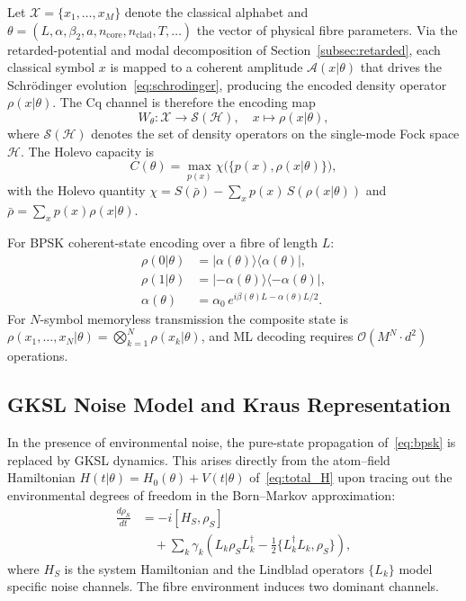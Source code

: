 \documentclass[journal,twocolumn]{IEEEtran}
\theoremstyle{definition}
\theoremstyle{plain}
\newcommand{\calH}{\mathcal{H}}
\begin{document}
Let $\mathcal{X} = \{x_1, \dots, x_M\}$ denote the classical
alphabet and $\theta = (L, \alpha, \beta_2, a, n_{\mathrm{core}},
n_{\mathrm{clad}}, T, \ldots)$ the vector of physical fibre
parameters.  Via the retarded-potential and modal decomposition of
Section~\ref{subsec:retarded}, each classical symbol $x$ is mapped
to a coherent amplitude $\mathcal{A}(x|\theta)$ that drives the
Schr\"{o}dinger evolution~\eqref{eq:schrodinger}, producing the
encoded density operator $\rho(x|\theta)$.  The Cq channel is
therefore the encoding map
\begin{equation}
  W_\theta : \mathcal{X} \to \mathcal{S}(\calH), \quad
  x \mapsto \rho(x|\theta),
  \label{eq:cq_channel}
\end{equation}
where $\mathcal{S}(\calH)$ denotes the set of density operators on
the single-mode Fock space $\calH$.  The Holevo capacity is
\begin{equation}
  C(\theta) = \max_{p(x)} \chi\bigl(\{p(x), \rho(x|\theta)\}\bigr),
  \label{eq:holevo_capacity}
\end{equation}
with the Holevo quantity
$\chi = S(\bar\rho) - \sum_x p(x)\, S(\rho(x|\theta))$ and
$\bar\rho = \sum_x p(x)\rho(x|\theta)$.

For BPSK coherent-state encoding over a fibre of length $L$:
\begin{align}
  \rho(0|\theta) &= |\alpha(\theta)\rangle\langle\alpha(\theta)|,
  \nonumber\\
  \rho(1|\theta) &= |-\alpha(\theta)\rangle\langle-\alpha(\theta)|,
  \label{eq:bpsk}\\
  \alpha(\theta) &= \alpha_0\,e^{i\beta(\theta)L - \alpha(\theta)L/2}.
  \nonumber
\end{align}
For $N$-symbol memoryless transmission the composite state is
$\rho(x_1,\dots,x_N|\theta) = \bigotimes_{k=1}^N \rho(x_k|\theta)$,
and ML decoding requires $\mathcal{O}(M^N \cdot d^2)$ operations.

\subsection{GKSL Noise Model and Kraus Representation}

In the presence of environmental noise, the pure-state propagation
of~\eqref{eq:bpsk} is replaced by GKSL dynamics.  This arises
directly from the atom--field Hamiltonian $H(t|\theta) = H_0(\theta)
+ V(t|\theta)$ of~\eqref{eq:total_H} upon tracing out the
environmental degrees of freedom in the Born--Markov approximation:
\begin{align}
  \frac{d\rho_S}{dt} &= -i[H_S, \rho_S] \nonumber\\
  &\quad + \sum_k \gamma_k \!\left(L_k \rho_S L_k^\dagger
    - \tfrac{1}{2}\{L_k^\dagger L_k, \rho_S\}\right),
  \label{eq:GKSL}
\end{align}
where $H_S$ is the system Hamiltonian and the Lindblad operators
$\{L_k\}$ model specific noise channels.  The fibre environment
induces two dominant channels.
\end{document}
